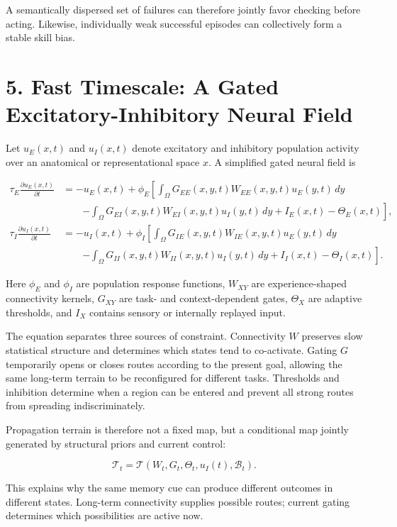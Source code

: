 \documentclass[11pt, a4paper]{article}
\begin{document}
A semantically dispersed set of failures can therefore jointly favor checking before acting. Likewise, individually weak successful episodes can collectively form a stable skill bias.


\section{5. Fast Timescale: A Gated Excitatory-Inhibitory Neural Field}

Let $u_E(x,t)$ and $u_I(x,t)$ denote excitatory and inhibitory population activity over an anatomical or representational space $x$. A simplified gated neural field is

\[
\begin{aligned}
\tau_E\frac{\partial u_E(x,t)}{\partial t}
&=-u_E(x,t)+\phi_E\left[
\int_\Omega G_{EE}(x,y,t)W_{EE}(x,y,t)u_E(y,t)\,dy\right.\\
&\qquad\left.-\int_\Omega G_{EI}(x,y,t)W_{EI}(x,y,t)u_I(y,t)\,dy
+I_E(x,t)-\Theta_E(x,t)\right],\\
\tau_I\frac{\partial u_I(x,t)}{\partial t}
&=-u_I(x,t)+\phi_I\left[
\int_\Omega G_{IE}(x,y,t)W_{IE}(x,y,t)u_E(y,t)\,dy\right.\\
&\qquad\left.-\int_\Omega G_{II}(x,y,t)W_{II}(x,y,t)u_I(y,t)\,dy
+I_I(x,t)-\Theta_I(x,t)\right].
\end{aligned}
\]

Here $\phi_E$ and $\phi_I$ are population response functions, $W_{XY}$ are experience-shaped connectivity kernels, $G_{XY}$ are task- and context-dependent gates, $\Theta_X$ are adaptive thresholds, and $I_X$ contains sensory or internally replayed input.

The equation separates three sources of constraint. Connectivity $W$ preserves slow statistical structure and determines which states tend to co-activate. Gating $G$ temporarily opens or closes routes according to the present goal, allowing the same long-term terrain to be reconfigured for different tasks. Thresholds and inhibition determine when a region can be entered and prevent all strong routes from spreading indiscriminately.

Propagation terrain is therefore not a fixed map, but a conditional map jointly generated by structural priors and current control:

\[
\mathcal{T}_t=\mathcal{T}(W_t,G_t,\Theta_t,u_I(t),\mathcal{B}_t).
\]

This explains why the same memory cue can produce different outcomes in different states. Long-term connectivity supplies possible routes; current gating determines which possibilities are active now.
\end{document}
